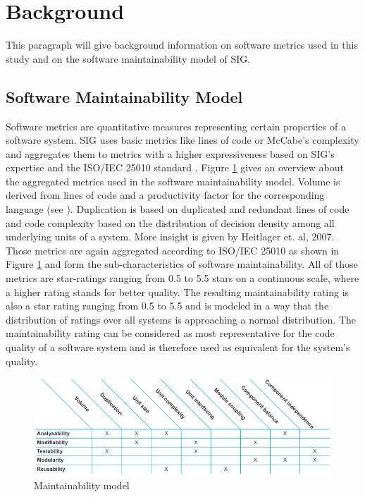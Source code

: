 \section{Background}
\label{sec:background}
This paragraph will give background information on software metrics used in this study and on the software maintainability model of SIG.

\subsection{Software Maintainability Model}
Software metrics are quantitative measures representing certain properties of a software system. SIG uses basic metrics like lines of code or McCabe's complexity and aggregates them to metrics with a higher expressiveness based on SIG's expertise \cite{heitlager2007practical} and the ISO/IEC 25010 standard \cite{iso25010}. Figure \ref{fig:mmodel} gives an overview about the aggregated metrics used in the software maintainability model. 
Volume is derived from lines of code and a productivity factor for the corresponding language (see \cite{jones1996programming}). Duplication is based on duplicated and redundant lines of code and code complexity based on the distribution of decision density among all underlying units of a system. More insight is given by Heitlager et. al, 2007. 
Those metrics are again aggregated according to ISO/IEC 25010 as shown in Figure \ref{fig:mmodel} and form the sub-characteristics of software maintainability. All of those metrics are star-ratings ranging from 0.5 to 5.5 stars on a continuous scale, where a higher rating stands for better quality. The resulting maintainability rating is also a star rating ranging from 0.5 to 5.5 and is modeled in a way that the distribution of ratings over all systems is approaching a normal distribution. The maintainability rating can be considered as most representative for the code quality of a software system and is therefore used as equivalent for the system's quality.

\begin{figure}[!htb]
  \centering
  \includegraphics[width=0.8\linewidth]{figs/mmodel.png}
  \caption{Maintainability model}
  \label{fig:mmodel}
\end{figure}


